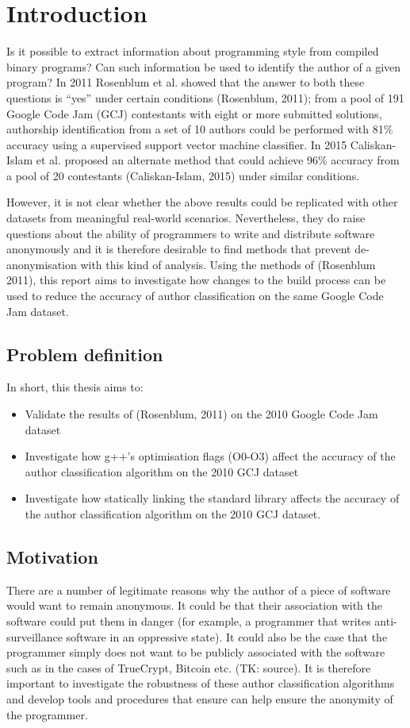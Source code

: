 \documentclass[a4paper,11pt]{kth-mag}
\begin{document}
\chapter{Introduction}
Is it possible to extract information about programming style from compiled
binary programs? Can such information be used to identify the author of a given
program? In 2011 Rosenblum et al. showed that the answer to both these
questions is “yes” under certain conditions (Rosenblum, 2011); from a pool of
191 Google Code Jam (GCJ) contestants with eight or more submitted solutions,
authorship identification from a set of 10 authors could be performed with 81\%
accuracy using a supervised support vector machine classifier. In 2015
Caliskan-Islam et al. proposed an alternate method that could achieve 96\%
accuracy from a pool of 20 contestants (Caliskan-Islam, 2015) under similar
conditions.

However, it is not clear whether the above results could be replicated with
other datasets from meaningful real-world scenarios. Nevertheless, they do
raise questions about the ability of programmers to write and distribute
software anonymously and it is therefore desirable to find methods that prevent
de-anonymisation with this kind of analysis. Using the methods of (Rosenblum
2011), this report aims to investigate how changes to the build process can be
used to reduce the accuracy of author classification on the same Google Code
Jam dataset.

\section{Problem definition}
In short, this thesis aims to:
\begin{itemize}
\item Validate the results of (Rosenblum, 2011) on the 2010 Google Code Jam dataset
\item Investigate how g++’s optimisation flags (O0-O3) affect the accuracy of the
      author classification algorithm on the 2010 GCJ dataset
\item Investigate how statically linking the standard library affects the accuracy of
      the author classification algorithm on the 2010 GCJ dataset.
\end{itemize}

\section{Motivation}
There are a number of legitimate reasons why the author of a piece of software
would want to remain anonymous. It could be that their association with the
software could put them in danger (for example, a programmer that writes
anti-surveillance software in an oppressive state). It could also be the case
that the programmer simply does not want to be publicly associated with the
software such as in the cases of TrueCrypt, Bitcoin etc. (TK: source). It is
therefore important to investigate the robustness of these author
classification algorithms and develop tools and procedures that ensure can help
ensure the anonymity of the programmer.
\end{document}

